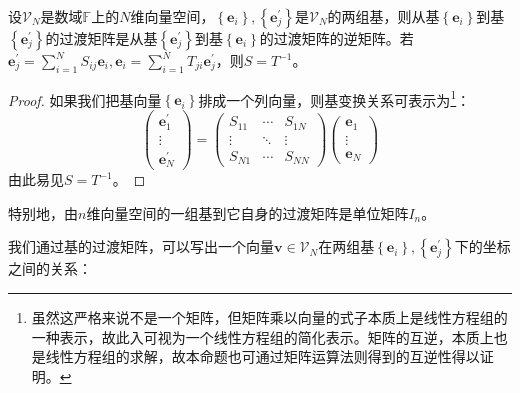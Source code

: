 \documentclass[main.tex]{subfiles}
\begin{document}
\begin{theorem}\label{thm:II.4.13}
设$\mathcal{V}_N$是数域$\mathbb{F}$上的$N$维向量空间，$\left\{\mathbf{e}_i\right\},\left\{\mathbf{e}^\prime_j\right\}$是$\mathcal{V}_N$的两组基，则从基$\left\{\mathbf{e}_i\right\}$到基$\left\{\mathbf{e}^\prime_j\right\}$的过渡矩阵是从基$\left\{\mathbf{e}^\prime_j\right\}$到基$\left\{\mathbf{e}_i\right\}$的过渡矩阵的逆矩阵。若$\mathbf{e}^\prime_j=\sum_{i=1}^NS_{ij}\mathbf{e}_i,\mathbf{e}_i=\sum_{i=1}^NT_{ji}\mathbf{e}^\prime_j$，则$S=T^{-1}$。
\end{theorem}
\begin{proof}
如果我们把基向量$\left\{\mathbf{e}_i\right\}$排成一个列向量，则基变换关系可表示为\footnote{虽然这严格来说不是一个矩阵，但矩阵乘以向量的式子本质上是线性方程组的一种表示，故此入可视为一个线性方程组的简化表示。矩阵的互逆，本质上也是线性方程组的求解，故本命题也可通过矩阵运算法则得到的互逆性得以证明。}：
\[
\left(\begin{array}{c}
\mathbf{e}^\prime_1\\
\vdots\\
\mathbf{e}^\prime_N
\end{array}\right)=\left(\begin{array}{ccc}
S_{11}&\cdots&S_{1N}\\
\vdots&\ddots&\vdots\\
S_{N1}&\cdots&S_{NN}
\end{array}\right)\left(\begin{array}{c}
\mathbf{e}_1\\
\vdots\\
\mathbf{e}_N
\end{array}\right)
\]
由此易见$S=T^{-1}$。
\end{proof}

特别地，由$n$维向量空间的一组基到它自身的过渡矩阵是单位矩阵$I_n$。

我们通过基的过渡矩阵，可以写出一个向量$\mathbf{v}\in\mathcal{V}_N$在两组基$\left\{\mathbf{e}_i\right\},\left\{\mathbf{e}^\prime_j\right\}$下的坐标之间的关系：
\end{document}
